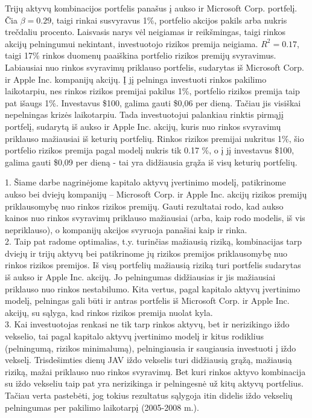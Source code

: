 \documentclass[12pt, a14paper, lithuanian]{article}
\begin{document}
Trijų aktyvų kombinacijos portfelis panašus į aukso ir Microsoft Corp. portfelį. Čia $\beta=0.29$, taigi rinkai susvyravus 1\%,
portfelio akcijos pakils arba nukris trečdaliu procento. Laisvasis narys vėl neigiamas ir reikšmingas, taigi
rinkos akcijų pelningumui nekintant, investuotojo rizikos premija neigiama. $R^2=0.17$, taigi 17\% rinkos duomenų
paaiškina portfelio rizikos premijų svyravimus.\\


Labiausiai nuo rinkos svyravimų priklauso portfelis, sudarytas iš Microsoft Corp. ir Apple Inc. kompanijų akcijų. 
Į jį pelninga investuoti rinkos pakilimo laikotarpiu, nes rinkos rizikos premijai pakilus 1\%, portfelio rizikos premija
taip pat išaugs 1\%. Investavus \$100, galima gauti \$0,06 per dieną. Tačiau jis visiškai nepelningas krizės 
laikotarpiu. Tada investuotojui palankiau rinktis pirmąjį portfelį, sudarytą iš aukso ir Apple Inc. akcijų, kuris nuo 
rinkos svyravimų priklauso mažiausiai iš keturių portfelių. Rinkos rizikos premijai nukritus 1\%, šio portfelio rizikos 
premija pagal modelį nukris tik 0.17 \%, o į jį investavus \$100, galima gauti \$0,09 per dieną - tai yra didžiausia 
grąža iš visų keturių portfelių.



\pagebreak




\newpage      
{}

1. Šiame darbe nagrinėjome kapitalo aktyvų įvertinimo modelį, patikrinome aukso bei dviejų kompanijų -- Microsoft Corp. ir Apple Inc. akcijų rizikos premijų priklausomybę nuo rinkos rizikos premijų. Gauti rezultatai rodo, kad aukso kainos nuo rinkos svyravimų priklauso mažiausiai (arba, kaip rodo modelis, iš vis nepriklauso), o kompanijų akcijos svyruoja panašiai kaip ir rinka.\\

2. Taip pat radome optimalias, t.y. turinčias mažiausią riziką, kombinacijas tarp dviejų ir trijų aktyvų bei patikrinome jų rizikos premijos priklausomybę nuo rinkos rizikos premijos. Iš visų portfelių mažiausią riziką turi portfelis sudarytas iš aukso ir Apple Inc. akcijų. Jo pelningumas didžiausias ir jis mažiausiai priklauso nuo rinkos nestabilumo. Kita vertus, pagal kapitalo aktyvų įvertinimo modelį, pelningas gali būti ir antras portfelis iš Microsoft Corp. ir Apple Inc. akcijų, su sąlyga, kad rinkos rizikos premija nuolat kyla.\\


3. Kai investuotojas renkasi ne tik tarp rinkos aktyvų, bet ir nerizikingo iždo vekselio, tai pagal kapitalo aktyvų įvertinimo modelį ir kitus rodiklius (pelningumą, rizikos minimalumą), pelningiausia ir saugiausia investuoti į iždo vekselį. Trisdešimties dienų JAV iždo vekselis turi didžiausią grąžą, mažiausią riziką, mažai priklauso nuo rinkos svyravimų. Bet kuri rinkos aktyvo kombinacija su iždo vekseliu taip pat yra nerizikinga ir pelningesnė už kitų aktyvų portfelius. Tačiau verta pastebėti, jog tokius rezultatus sąlygoja itin didelis iždo vekselių pelningumas per pakilimo laikotarpį (2005-2008 m.).  \\
\end{document}
